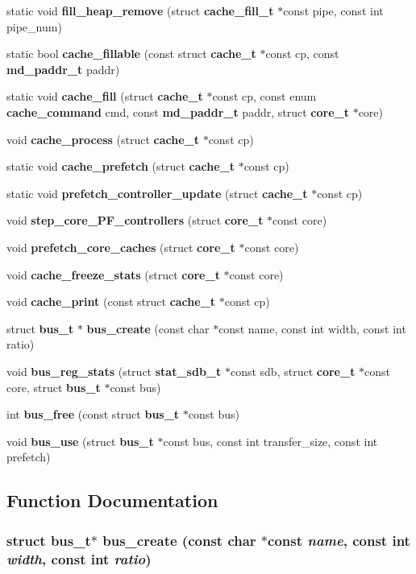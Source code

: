 \begin{CompactItemize}
\item 
static void {\bf fill\_\-heap\_\-remove} (struct {\bf cache\_\-fill\_\-t} $\ast$const pipe, const int pipe\_\-num)
\item 
static bool {\bf cache\_\-fillable} (const struct {\bf cache\_\-t} $\ast$const cp, const {\bf md\_\-paddr\_\-t} paddr)
\item 
static void {\bf cache\_\-fill} (struct {\bf cache\_\-t} $\ast$const cp, const enum {\bf cache\_\-command} cmd, const {\bf md\_\-paddr\_\-t} paddr, struct {\bf core\_\-t} $\ast$core)
\item 
void {\bf cache\_\-process} (struct {\bf cache\_\-t} $\ast$const cp)
\item 
static void {\bf cache\_\-prefetch} (struct {\bf cache\_\-t} $\ast$const cp)
\item 
static void {\bf prefetch\_\-controller\_\-update} (struct {\bf cache\_\-t} $\ast$const cp)
\item 
void {\bf step\_\-core\_\-PF\_\-controllers} (struct {\bf core\_\-t} $\ast$const core)
\item 
void {\bf prefetch\_\-core\_\-caches} (struct {\bf core\_\-t} $\ast$const core)
\item 
void {\bf cache\_\-freeze\_\-stats} (struct {\bf core\_\-t} $\ast$const core)
\item 
void {\bf cache\_\-print} (const struct {\bf cache\_\-t} $\ast$const cp)
\item 
struct {\bf bus\_\-t} $\ast$ {\bf bus\_\-create} (const char $\ast$const name, const int width, const int ratio)
\item 
void {\bf bus\_\-reg\_\-stats} (struct {\bf stat\_\-sdb\_\-t} $\ast$const sdb, struct {\bf core\_\-t} $\ast$const core, struct {\bf bus\_\-t} $\ast$const bus)
\item 
int {\bf bus\_\-free} (const struct {\bf bus\_\-t} $\ast$const bus)
\item 
void {\bf bus\_\-use} (struct {\bf bus\_\-t} $\ast$const bus, const int transfer\_\-size, const int prefetch)
\end{CompactItemize}


\subsection{Function Documentation}
\subsubsection[{bus\_\-create}]{\setlength{\rightskip}{0pt plus 5cm}struct {\bf bus\_\-t}$\ast$ bus\_\-create (const char $\ast$const  {\em name}, \/  const int {\em width}, \/  const int {\em ratio})\hspace{0.3cm}{\tt  [read]}}\label{config_2zesto-cache_8cpp_cf58fdfdf1939cc2b0b05b50ac0eedd8}




